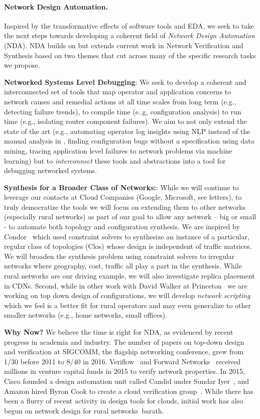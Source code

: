 \paragraph*{Network Design Automation.}
%
Inspired by the transformative effects of software tools and EDA, we seek to take the next steps towards developing a coherent field of {\em Network Design Automation} (NDA). NDA 
builds on but extends current work in Network Verification and Synthesis based on two
themes that cut across many of the specific research tasks we propose.

{\bf Networked Systems Level Debugging}:  We seek to develop a coherent and interconnected set of tools that map operator and application concerns  to network causes and remedial actions at all time scales from  long term (e.g., detecting failure trends), to compile time (e..g, 
configuration analysis) to run time (e.g., isolating router component failures).  We aim to 
not only extend the state of the art  (e.g., automating operator log insights using NLP instead of
the manual analysis in \cite{rameshgoogle}, finding configuration bugs without a specification
using data mining, tracing application level failures to network problems via machine learning) 
but to \emph{interconnect} these tools and abstractions into a tool for debugging networked
systems.

{\bf Synthesis for a Broader Class of Networks:}: While we will continue to leverage our contacts at Cloud Companies (Google, Microsoft, see letters), to truly democratize the tools we will focus on extending them to other networks (especially rural networks) as part of our goal to allow any network -- big or small - to automate both topology and configuration synthesis.   
We are inspired by Condor~\cite{condor} which used constraint solvers to synthesize an instance of a particular, regular class of topologies (Clos) whose design is independent of traffic matrices.   We will broaden the synthesis problem using constraint solvers to irregular networks where geography, cost, traffic all play a part in the synthesis. While rural networks are our driving example, we will also investigate replica placement in CDNs. Second, while in other
work with David Walker at Princeton~\cite{butane} we are working on top down design of
configurations, we will develop \emph{network scripting} which we feel is a better fit for rural operators and may even generalize to other smaller networks (e.g., home networks, small offices).

{\bf Why Now?} We believe the time is right for NDA, as evidenced by recent progress in academia and industry.  The number of papers on top-down design and verification at SIGCOMM, the flagship networking conference, grew from 1/30 before 2011 to 8/40 in 2016. Veriflow~\cite{veriflow} and Forward Networks~\cite{forward} received millions in venture capital funds in 2015 to verify network properties. In 2015, Cisco founded a design automation unit called Candid under Sundar Iyer~\cite{sundar}, and Amazon hired Byron Cook to create a cloud verification group~\cite{byron}.  While there has been a flurry of recent activity in 
design tools for clouds, initial work has also begun on network design for rural
networks~{barath}.




